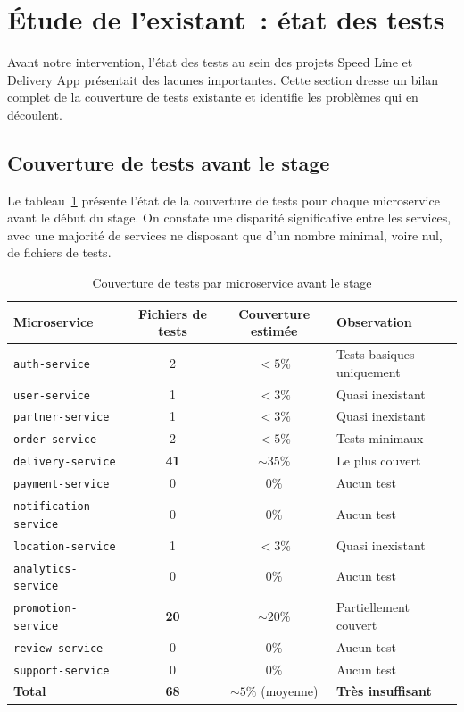 \section{Étude de l'existant~: état des tests}
\label{sec:etude-existant-tests}

Avant notre intervention, l'état des tests au sein des projets Speed Line et Delivery App présentait des lacunes importantes. Cette section dresse un bilan complet de la couverture de tests existante et identifie les problèmes qui en découlent.

\subsection{Couverture de tests avant le stage}
\label{subsec:couverture-tests-avant}

Le tableau~\ref{tab:couverture-tests-avant} présente l'état de la couverture de tests pour chaque microservice avant le début du stage. On constate une disparité significative entre les services, avec une majorité de services ne disposant que d'un nombre minimal, voire nul, de fichiers de tests.

\begin{table}[H]
\centering
\caption{Couverture de tests par microservice avant le stage}
\label{tab:couverture-tests-avant}
\begin{tabular}{|l|c|c|l|}
\hline
\rowcolor{gray!20}
\textbf{Microservice} & \textbf{Fichiers de tests} & \textbf{Couverture estimée} & \textbf{Observation} \\
\hline
\texttt{auth-service} & 2 & $< 5\%$ & Tests basiques uniquement \\
\hline
\texttt{user-service} & 1 & $< 3\%$ & Quasi inexistant \\
\hline
\texttt{partner-service} & 1 & $< 3\%$ & Quasi inexistant \\
\hline
\texttt{order-service} & 2 & $< 5\%$ & Tests minimaux \\
\hline
\texttt{delivery-service} & \textbf{41} & $\sim 35\%$ & Le plus couvert \\
\hline
\texttt{payment-service} & 0 & $0\%$ & Aucun test \\
\hline
\texttt{notification-service} & 0 & $0\%$ & Aucun test \\
\hline
\texttt{location-service} & 1 & $< 3\%$ & Quasi inexistant \\
\hline
\texttt{analytics-service} & 0 & $0\%$ & Aucun test \\
\hline
\texttt{promotion-service} & \textbf{20} & $\sim 20\%$ & Partiellement couvert \\
\hline
\texttt{review-service} & 0 & $0\%$ & Aucun test \\
\hline
\texttt{support-service} & 0 & $0\%$ & Aucun test \\
\hline
\rowcolor{blue!5}
\textbf{Total} & \textbf{68} & $\sim 5\%$ (moyenne) & \textbf{Très insuffisant} \\
\hline
\end{tabular}
\end{table}

